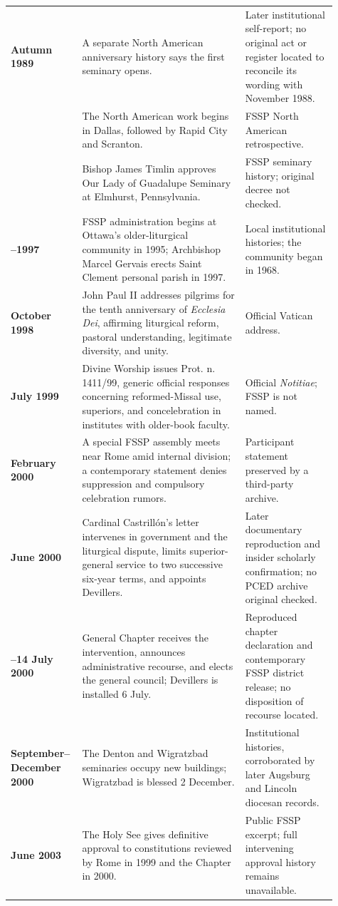 \begin{longtable}{>{\bfseries\RaggedRight\arraybackslash}p{0.16\linewidth}>{\RaggedRight\arraybackslash}p{0.48\linewidth}>{\RaggedRight\arraybackslash}p{0.27\linewidth}}
Autumn 1989 & A separate North American anniversary history says the first seminary opens. & Later institutional self-report; no original act or register located to reconcile its wording with November 1988.\\
1991 & The North American work begins in Dallas, followed by Rapid City and Scranton. & FSSP North American retrospective.\\
1994 & Bishop James Timlin approves Our Lady of Guadalupe Seminary at Elmhurst, Pennsylvania. & FSSP seminary history; original decree not checked.\\
1995--1997 & FSSP administration begins at Ottawa's older-liturgical community in 1995; Archbishop Marcel Gervais erects Saint Clement personal parish in 1997. & Local institutional histories; the community began in 1968.\\
26 October 1998 & John Paul II addresses pilgrims for the tenth anniversary of \emph{Ecclesia Dei}, affirming liturgical reform, pastoral understanding, legitimate diversity, and unity. & Official Vatican address.\\
3 July 1999 & Divine Worship issues Prot. n. 1411/99, generic official responses concerning reformed-Missal use, superiors, and concelebration in institutes with older-book faculty. & Official \emph{Notitiae}; FSSP is not named.\\
February 2000 & A special FSSP assembly meets near Rome amid internal division; a contemporary statement denies suppression and compulsory celebration rumors. & Participant statement preserved by a third-party archive.\\
29 June 2000 & Cardinal Castrillón's letter intervenes in government and the liturgical dispute, limits superior-general service to two successive six-year terms, and appoints Devillers. & Later documentary reproduction and insider scholarly confirmation; no PCED archive original checked.\\
4--14 July 2000 & General Chapter receives the intervention, announces administrative recourse, and elects the general council; Devillers is installed 6 July. & Reproduced chapter declaration and contemporary FSSP district release; no disposition of recourse located.\\
September--December 2000 & The Denton and Wigratzbad seminaries occupy new buildings; Wigratzbad is blessed 2 December. & Institutional histories, corroborated by later Augsburg and Lincoln diocesan records.\\
29 June 2003 & The Holy See gives definitive approval to constitutions reviewed by Rome in 1999 and the Chapter in 2000. & Public FSSP excerpt; full intervening approval history remains unavailable.\\

\end{longtable}
